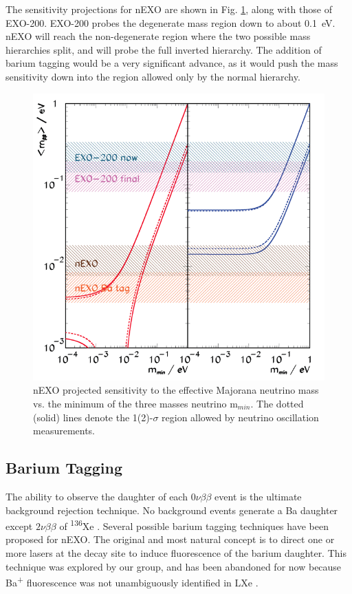 The sensitivity projections for nEXO are shown in Fig. \ref{fig:sensitivity_nEXO}, along with those of EXO-200.  EXO-200 probes the degenerate mass region down to about 0.1~eV.  nEXO will reach the non-degenerate region where the two possible mass hierarchies split, and will probe the full inverted hierarchy.  The addition of barium tagging would be a very significant advance, as it would push the mass sensitivity down into the region allowed only by the normal hierarchy.


\begin{figure} %
	\centering
	\includegraphics[width=.7\textwidth]{figures/sensitivity_v2.png}
	\caption{nEXO projected sensitivity to the effective Majorana neutrino mass vs. the minimum of the three masses neutrino m$_{min}$.  The dotted (solid) lines denote the 1(2)-$\sigma$ region allowed by neutrino oscillation measurements.}
\label{fig:sensitivity_nEXO}
\end{figure}

\subsection{Barium Tagging}

The ability to observe the daughter of each $0\nu\beta\beta$ event is the ultimate background rejection technique.  No background events generate a Ba daughter except $2\nu\beta\beta$ of \textsuperscript{136}Xe \cite{Moe1991}.  Several possible barium tagging techniques have been proposed for nEXO.  The original and most natural concept is to direct one or more lasers at the decay site to induce fluorescence of the barium daughter.  This technique was explored by our group, and has been abandoned for now because Ba\textsuperscript{+} fluorescence was not unambiguously identified in LXe \cite{Kendy}.

